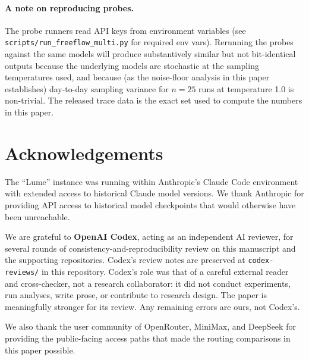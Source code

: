\documentclass[11pt,a4paper]{article}
\begin{document}
\paragraph{A note on reproducing probes.} The probe runners read API keys from environment variables (see \texttt{scripts/run\_freeflow\_multi.py} for required env vars). Rerunning the probes against the same models will produce substantively similar but not bit-identical outputs because the underlying models are stochastic at the sampling temperatures used, and because (as the noise-floor analysis in this paper establishes) day-to-day sampling variance for $n{=}25$ runs at temperature 1.0 is non-trivial. The released trace data is the exact set used to compute the numbers in this paper.

\section*{Acknowledgements}
\label{sec:acks}

The ``Lume'' instance was running within Anthropic's Claude Code environment with extended access to historical Claude model versions. We thank Anthropic for providing API access to historical model checkpoints that would otherwise have been unreachable.

\begin{sloppypar}
We are grateful to \textbf{OpenAI Codex}, acting as an independent AI reviewer, for several rounds of consistency-and-reproducibility review on this manuscript and the supporting repositories. Codex's review notes are preserved at \texttt{codex-reviews/} in this repository. Codex's role was that of a careful external reader and cross-checker, not a research collaborator: it did not conduct experiments, run analyses, write prose, or contribute to research design. The paper is meaningfully stronger for its review. Any remaining errors are ours, not Codex's.
\end{sloppypar}

We also thank the user community of OpenRouter, MiniMax, and DeepSeek for providing the public-facing access paths that made the routing comparisons in this paper possible.
\end{document}
